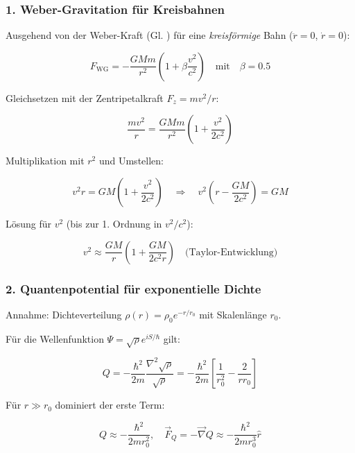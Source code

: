 \subsubsection{1. Weber-Gravitation für Kreisbahnen}
Ausgehend von der Weber-Kraft (Gl. ) für eine \textit{kreisförmige} Bahn ($\ddot{r} = 0$, $\dot{r} = 0$):

\begin{equation}
F_{\text{WG}} = -\frac{GMm}{r^2}\left(1 + \beta\frac{v^2}{c^2}\right) \quad \text{mit} \quad \beta = 0.5
\end{equation}

Gleichsetzen mit der Zentripetalkraft $F_z = mv^2/r$:

\begin{equation}
\frac{mv^2}{r} = \frac{GMm}{r^2}\left(1 + \frac{v^2}{2c^2}\right)
\end{equation}

Multiplikation mit $r^2$ und Umstellen:

\begin{equation}
v^2r = GM\left(1 + \frac{v^2}{2c^2}\right) \quad \Rightarrow \quad v^2\left(r - \frac{GM}{2c^2}\right) = GM
\end{equation}

Lösung für $v^2$ (bis zur 1. Ordnung in $v^2/c^2$):

\begin{equation}
v^2 \approx \frac{GM}{r}\left(1 + \frac{GM}{2c^2r}\right) \quad \text{(Taylor-Entwicklung)}
\end{equation}

\subsubsection{2. Quantenpotential für exponentielle Dichte}
Annahme: Dichteverteilung $\rho(r) = \rho_0 e^{-r/r_0}$ mit Skalenlänge $r_0$.

Für die Wellenfunktion $\Psi = \sqrt{\rho} e^{iS/\hbar}$ gilt:

\begin{equation}
Q = -\frac{\hbar^2}{2m}\frac{\nabla^2\sqrt{\rho}}{\sqrt{\rho}} = -\frac{\hbar^2}{2m}\left[\frac{1}{r_0^2} - \frac{2}{rr_0}\right]
\end{equation}

Für $r \gg r_0$ dominiert der erste Term:

\begin{equation}
Q \approx -\frac{\hbar^2}{2m r_0^2}, \quad \vec{F}_Q = -\vec{\nabla}Q \approx -\frac{\hbar^2}{2m r_0^3}\hat{r}
\end{equation}

